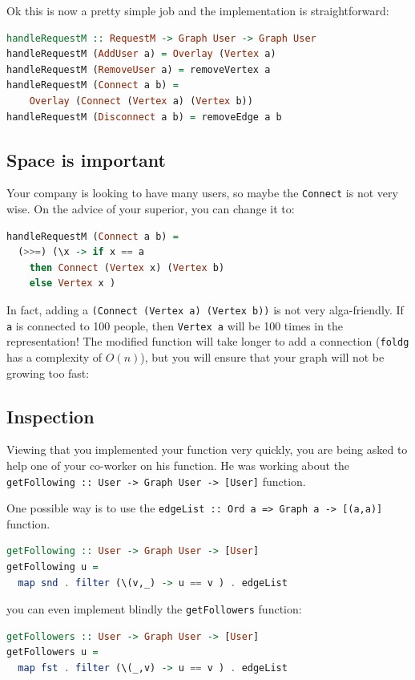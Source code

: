 \documentclass[10pt,a4paper]{article}
\begin{document}
Ok this is now a pretty simple job and the implementation is straightforward: 
\begin{lstlisting}[language=Haskell, frame=single]
handleRequestM :: RequestM -> Graph User -> Graph User
handleRequestM (AddUser a) = Overlay (Vertex a)
handleRequestM (RemoveUser a) = removeVertex a
handleRequestM (Connect a b) = 
	Overlay (Connect (Vertex a) (Vertex b))
handleRequestM (Disconnect a b) = removeEdge a b
\end{lstlisting}

\subsection{Space is important}
Your company is looking to have many users, so maybe the \verb|Connect| is not very wise. On the advice of your superior, you can change it to:
\begin{lstlisting}[language=Haskell, frame=single]
handleRequestM (Connect a b) = 
  (>>=) (\x -> if x == a 
    then Connect (Vertex x) (Vertex b)
    else Vertex x )
\end{lstlisting}
In fact, adding a \verb|(Connect (Vertex a) (Vertex b))| is not very alga-friendly. If \verb|a| is connected to 100 people, then \verb|Vertex a| will be 100 times in the representation!
The modified function will take longer to add a connection (\verb|foldg| has a complexity of $O(n)$), but you will ensure that your graph will not be growing too fast:

\subsection{Inspection}
Viewing that you implemented your function very quickly, you are being asked to help one of your co-worker on his function. He was working about the \verb|getFollowing :: User -> Graph User -> [User]| function.

One possible way is to use the \verb|edgeList :: Ord a => Graph a -> [(a,a)]| function.

\begin{lstlisting}[language=Haskell, frame=single]
getFollowing :: User -> Graph User -> [User]
getFollowing u =
  map snd . filter (\(v,_) -> u == v ) . edgeList
\end{lstlisting}

you can even implement blindly the \verb|getFollowers| function:
\begin{lstlisting}[language=Haskell, frame=single]
getFollowers :: User -> Graph User -> [User]
getFollowers u =
  map fst . filter (\(_,v) -> u == v ) . edgeList
\end{lstlisting}
\end{document}
